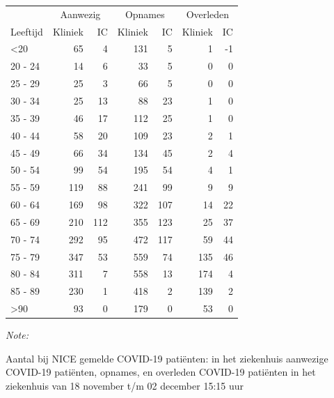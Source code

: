 \documentclass[
  english,
  man,floatsintext]{apa6}
\begin{document}
\begin{table}
\centering\begingroup\fontsize{10}{12}\selectfont

\begin{threeparttable}
\begin{tabular}{lrrrrrr}
\toprule
\multicolumn{1}{c}{ } & \multicolumn{2}{c}{Aanwezig} & \multicolumn{2}{c}{Opnames} & \multicolumn{2}{c}{Overleden} \\
\cmidrule(l{3pt}r{3pt}){2-3} \cmidrule(l{3pt}r{3pt}){4-5} \cmidrule(l{3pt}r{3pt}){6-7}
Leeftijd & Kliniek & IC & Kliniek & IC & Kliniek & IC\\
\midrule
<20 & 65 & 4 & 131 & 5 & 1 & -1\\
20 - 24 & 14 & 6 & 33 & 5 & 0 & 0\\
25 - 29 & 25 & 3 & 66 & 5 & 0 & 0\\
30 - 34 & 25 & 13 & 88 & 23 & 1 & 0\\
35 - 39 & 46 & 17 & 112 & 25 & 1 & 0\\
40 - 44 & 58 & 20 & 109 & 23 & 2 & 1\\
45 - 49 & 66 & 34 & 134 & 45 & 2 & 4\\
50 - 54 & 99 & 54 & 195 & 54 & 4 & 1\\
55 - 59 & 119 & 88 & 241 & 99 & 9 & 9\\
60 - 64 & 169 & 98 & 322 & 107 & 14 & 22\\
65 - 69 & 210 & 112 & 355 & 123 & 25 & 37\\
70 - 74 & 292 & 95 & 472 & 117 & 59 & 44\\
75 - 79 & 347 & 53 & 559 & 74 & 135 & 46\\
80 - 84 & 311 & 7 & 558 & 13 & 174 & 4\\
85 - 89 & 230 & 1 & 418 & 2 & 139 & 2\\
>90 & 93 & 0 & 179 & 0 & 53 & 0\\
\bottomrule
\end{tabular}
\begin{tablenotes}
\item \textit{Note: } 
\item Aantal bij NICE gemelde COVID-19 patiënten: in het ziekenhuis aanwezige COVID-19 patiënten, opnames, en overleden COVID-19 patiënten in het ziekenhuis van 18 november t/m 02 december 15:15 uur
\end{tablenotes}
\end{threeparttable}
\endgroup{}
\end{table}

\newpage
\end{document}
